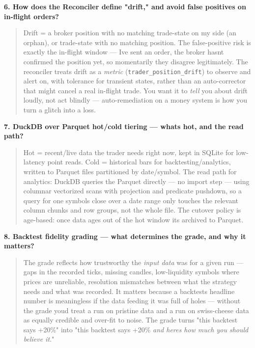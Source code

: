 \documentclass[11pt]{article}
\begin{document}
\textbf{6. How does the Reconciler define "drift," and avoid false positives on in-flight orders?}

\begin{quote}
Drift = a broker position with no matching trade-state on my side (an orphan), or trade-state
with no matching position. The false-positive risk is exactly the in-flight window --- I\textquotesingle ve sent an
order, the broker hasn\textquotesingle t confirmed the position yet, so momentarily they disagree legitimately.
The reconciler treats drift as a \emph{metric} (\texttt{trader\_position\_drift}) to observe and alert on,
with tolerance for transient states, rather than an auto-corrector that might cancel a real
in-flight trade. You want it to \emph{tell} you about drift loudly, not act blindly --- auto-remediation
on a money system is how you turn a glitch into a loss.
\end{quote}

\textbf{7. DuckDB over Parquet hot/cold tiering --- what\textquotesingle s hot, and the read path?}

\begin{quote}
Hot = recent/live data the trader needs right now, kept in SQLite for low-latency point reads.
Cold = historical bars for backtesting/analytics, written to Parquet files partitioned by
date/symbol. The read path for analytics: DuckDB queries the Parquet directly --- no import step ---
using columnar vectorized scans with projection and predicate pushdown, so a query for one
symbol\textquotesingle s close over a date range only touches the relevant column chunks and row groups, not the
whole file. The cutover policy is age-based: once data ages out of the hot window it\textquotesingle s archived to
Parquet.
\end{quote}

\textbf{8. Backtest fidelity grading --- what determines the grade, and why it matters?}

\begin{quote}
The grade reflects how trustworthy the \emph{input data} was for a given run --- gaps in the recorded
ticks, missing candles, low-liquidity symbols where prices are unreliable, resolution mismatches
between what the strategy needs and what was recorded. It matters because a backtest\textquotesingle s headline
number is meaningless if the data feeding it was full of holes --- without the grade you\textquotesingle d treat a
run on pristine data and a run on swiss-cheese data as equally credible and over-fit to noise.
The grade turns "this backtest says +20\%" into "this backtest says +20\% \emph{and here\textquotesingle s how much you
should believe it}."
\end{quote}
\end{document}
